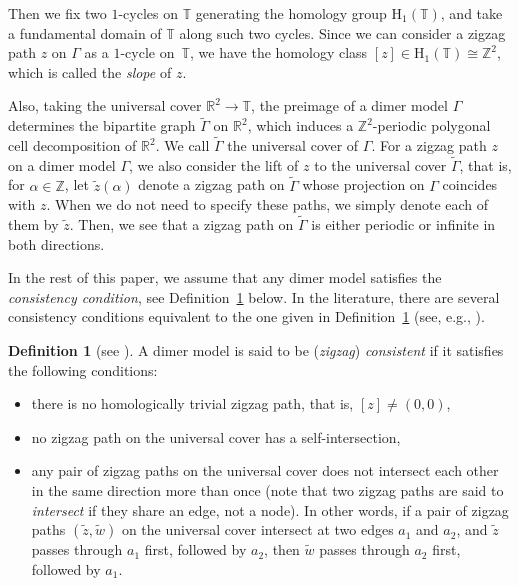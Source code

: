 \documentclass[10pt,a4paper]{amsart}
\numberwithin{equation}{section}
\theoremstyle{definition}
\newtheorem{Definition}[Theorem]{Definition}
\newcommand{\ZZ}{\mathbb{Z}}
\newcommand{\RR}{\mathbb{R}}
\newcommand{\TT}{\mathbb{T}}
\newcommand{\rmH}{\mathrm{H}}
\begin{document}
Then we fix two $1$-cycles on $\TT$ generating the homology group $\rmH_1(\TT)$, and take a fundamental domain of $\TT$ along such two cycles.
Since we can consider a zigzag path $z$ on $\Gamma$ as a $1$-cycle on~$\TT$, we have the homology class $[z]\in\rmH_1(\TT)\cong\ZZ^2$,
which is called the \emph{slope} of $z$.


Also, taking the universal cover $\RR^2\rightarrow\TT$, the preimage of a dimer model $\Gamma$ determines the bipartite graph $\widetilde{\Gamma}$ on $\RR^2$, which induces a $\ZZ^2$-periodic polygonal cell decomposition of $\RR^2$.
We call $\widetilde{\Gamma}$ the universal cover of $\Gamma$.
For a zigzag path $z$ on a dimer model $\Gamma$, we also consider the lift of $z$ to the universal cover $\widetilde{\Gamma}$,
that is, for $\alpha\in\ZZ$, let $\widetilde{z}{(\alpha)}$ denote a zigzag path on $\widetilde{\Gamma}$ whose projection on $\Gamma$ coincides with $z$.
When we do not need to specify these paths, we simply denote each of them by $\widetilde{z}$.
Then, we see that a zigzag path on $\widetilde{\Gamma}$ is either periodic or infinite in both directions.

In the rest of this paper, we assume that any dimer model satisfies the \emph{consistency condition}, see Definition~\ref{def_consistent} below.
In the literature, there are several consistency conditions equivalent to the one given in Definition~\ref{def_consistent} (see, e.g., \cite{Boc_consistent,IU_consistent}).

\begin{Definition}[{see \cite[Definition~3.5]{IU_consistent}}]\label{def_consistent}
A dimer model is said to be (\emph{zigzag}) \emph{consistent} if it satisfies the following conditions:
\begin{itemize}\itemsep=0pt
\item [(1)] there is no homologically trivial zigzag path, that is, $[z]\neq (0,0)$,
\item [(2)] no zigzag path on the universal cover has a self-intersection,
\item [(3)] any pair of zigzag paths on the universal cover does not intersect each other in the same direction more than once (note that two zigzag paths are said to \emph{intersect} if they share an edge, not a node).
In other words, if a pair of zigzag paths $(\widetilde{z},\widetilde{w})$ on the universal cover intersect at two edges $a_1$ and $a_2$,
and $\widetilde{z}$ passes through $a_1$ first, followed by $a_2$,
then $\widetilde{w}$ passes through $a_2$ first, followed by $a_1$.
\end{itemize}
\end{Definition}
\end{document}
